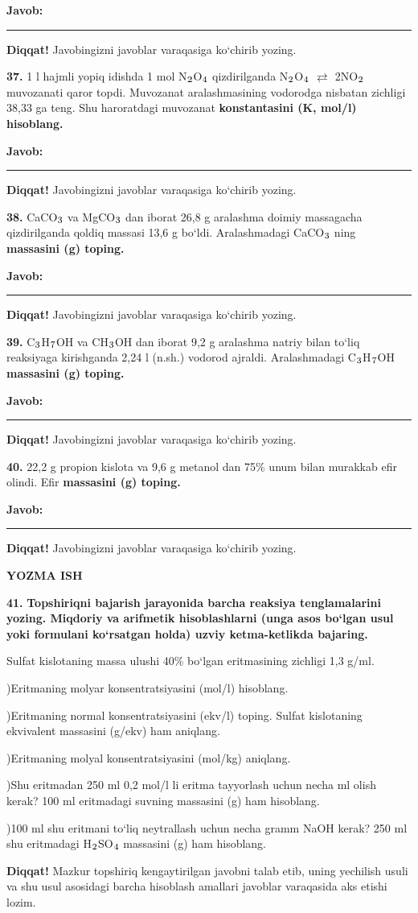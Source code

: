 \documentclass[11pt,a4paper]{article}
\renewcommand{\textsubscript}[1]{\ensuremath{_{\text{\fontsize{8}{8}\selectfont #1}}}}
\newcommand{\diqqat}[1]{\par\smallskip\noindent\textbf{Diqqat!} #1\par\medskip}
\newcommand{\javob}{\par\smallskip\noindent\textbf{Javob:} \rule[-2pt]{7.5cm}{0.4pt}\par\smallskip\noindent\textbf{Diqqat!} Javobingizni javoblar varaqasiga ko`chirib yozing.\par\medskip}
\begin{document}
\javob
\noindent\textbf{37.} 1 l hajmli yopiq idishda 1 mol N\textsubscript{2}O\textsubscript{4} qizdirilganda N\textsubscript{2}O\textsubscript{4} $\rightleftarrows$ 2NO\textsubscript{2} muvozanati qaror topdi. Muvozanat aralashmasining vodorodga nisbatan zichligi 38,33 ga teng. Shu haroratdagi muvozanat \textbf{konstantasini (K, mol/l) hisoblang.}
\javob
\noindent\textbf{38.} CaCO\textsubscript{3} va MgCO\textsubscript{3} dan iborat 26,8 g aralashma doimiy massagacha qizdirilganda qoldiq massasi 13,6 g bo`ldi. Aralashmadagi CaCO\textsubscript{3} ning \textbf{massasini (g) toping.}
\javob
\noindent\textbf{39.} C\textsubscript{3}H\textsubscript{7}OH va CH\textsubscript{3}OH dan iborat 9,2 g aralashma natriy bilan to`liq reaksiyaga kirishganda 2,24 l (n.sh.) vodorod ajraldi. Aralashmadagi C\textsubscript{3}H\textsubscript{7}OH \textbf{massasini (g) toping.}
\javob
\noindent\textbf{40.} 22,2 g propion kislota va 9,6 g metanol dan 75\% unum bilan murakkab efir olindi. Efir \textbf{massasini (g) toping.}
\javob
\par\bigskip\begin{center}\textbf{\fontsize{13}{15}\selectfont YOZMA ISH}\end{center}
\noindent\textbf{41.} \textbf{Topshiriqni bajarish jarayonida barcha reaksiya tenglamalarini yozing. Miqdoriy va arifmetik hisoblashlarni (unga asos bo`lgan usul yoki formulani ko`rsatgan holda) uzviy ketma-ketlikda bajaring.}\par\smallskip
Sulfat kislotaning massa ulushi 40\% bo`lgan eritmasining zichligi 1,3 g/ml.\par
{})Eritmaning molyar konsentratsiyasini (mol/l) hisoblang.\par
{})Eritmaning normal konsentratsiyasini (ekv/l) toping. Sulfat kislotaning ekvivalent massasini (g/ekv) ham aniqlang.\par
{})Eritmaning molyal konsentratsiyasini (mol/kg) aniqlang.\par
{})Shu eritmadan 250 ml 0,2 mol/l li eritma tayyorlash uchun necha ml olish kerak? 100 ml eritmadagi suvning massasini (g) ham hisoblang.\par
{})100 ml shu eritmani to`liq neytrallash uchun necha gramm NaOH kerak? 250 ml shu eritmadagi H\textsubscript{2}SO\textsubscript{4} massasini (g) ham hisoblang.\par
\diqqat{Mazkur topshiriq kengaytirilgan javobni talab etib, uning yechilish usuli va shu usul asosidagi barcha hisoblash amallari javoblar varaqasida aks etishi lozim.}
\end{document}
